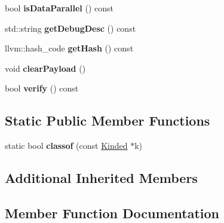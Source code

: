 \begin{DoxyCompactItemize}
\item 
\mbox{\label{classglow_1_1_constant_aa27d8ba25ea8ad70ef171196250349a7}} 
bool {\bfseries is\+Data\+Parallel} () const
\item 
\mbox{\label{classglow_1_1_constant_ac9a43f6902b3b42675af472640924480}} 
std\+::string {\bfseries get\+Debug\+Desc} () const
\item 
\mbox{\label{classglow_1_1_constant_a35490f46c989c8b4aeaf75d607387705}} 
llvm\+::hash\+\_\+code {\bfseries get\+Hash} () const
\item 
\mbox{\label{classglow_1_1_constant_a126e1379478833112642d7feb28c4c72}} 
void {\bfseries clear\+Payload} ()
\item 
\mbox{\label{classglow_1_1_constant_af45fb1415fdf61d6a68854e9b9b4c038}} 
bool {\bfseries verify} () const
\end{DoxyCompactItemize}
\subsection*{Static Public Member Functions}
\begin{DoxyCompactItemize}
\item 
\mbox{\label{classglow_1_1_constant_ad62a0f3dc0b39334e39758aa22ba664f}} 
static bool {\bfseries classof} (const \hyperlink{classglow_1_1_kinded}{Kinded} $\ast$k)
\end{DoxyCompactItemize}
\subsection*{Additional Inherited Members}


\subsection{Member Function Documentation}
\mbox{\label{classglow_1_1_constant_ae0b1b3aecc549a9f9885558753391500}} 
